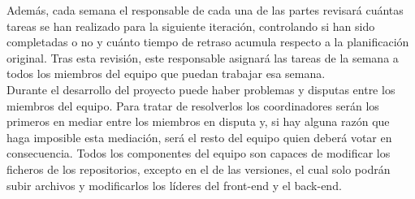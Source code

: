 \documentclass{article}
\begin{document}
\hfill \break
Además, cada semana el responsable de cada una de las partes revisará cuántas tareas se han realizado para la siguiente iteración, controlando si han sido completadas o no y cuánto tiempo de retraso acumula respecto a la planificación original.  Tras esta revisión, este responsable asignará las tareas de la semana a todos los miembros del equipo que puedan trabajar esa semana. \\
\hfill \break
Durante el desarrollo del proyecto puede haber problemas y disputas entre los miembros del equipo. Para tratar de resolverlos los coordinadores serán los primeros en mediar entre los miembros en disputa y, si hay alguna razón que haga imposible esta mediación, será el resto del equipo quien deberá votar en consecuencia. 
\hfill \break
Todos los componentes del equipo son capaces de modificar los ficheros de los repositorios, excepto en el de las versiones, el cual solo podrán subir archivos y modificarlos los líderes del front-end y el back-end.
\newpage
\end{document}
